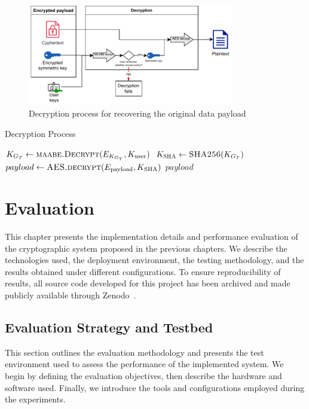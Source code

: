 \documentclass[cic,tc,english]{iiufrgs}
\begin{document}
        \begin{figure}
            \centering
            \includegraphics[width=0.8\textwidth]{images/diagrams/decryption_diagram}
            \caption{Decryption process for recovering the original data payload}
            \label{fig:decryption_diagram}
        \end{figure}

        \begin{algorithm}
            \caption{Decryption Process}
            \label{alg:decryption_process}
            \scriptsize
            \begin{algorithmic}[1]
                \State $K_{G_T} \gets \textsc{maabe.Decrypt}(E_{K_{G_T}}, K_{\text{user}})$
                \State $K_{\textsc{SHA}} \gets \textsc{SHA256}(K_{G_T})$
                \State $payload \gets \textsc{AES.decrypt}(E_{\text{payload}}, K_{\text{SHA}})$
                \State \Return $payload$
            \EndProcedure
            \end{algorithmic}
        \end{algorithm}





\chapter{Evaluation}
    \label{chap:evaluation}
    This chapter presents the implementation details and performance evaluation of the cryptographic system proposed in the previous chapters. We describe the technologies used, the deployment environment, the testing methodology, and the results obtained under different configurations. To ensure reproducibility of results, all source code developed for this project has been archived and made publicly available through Zenodo~\citep{maabeflask}.

    

    \section{Evaluation Strategy and Testbed}
        \label{sec:evaluation-setup}
        This section outlines the evaluation methodology and presents the test environment used to assess the performance of the implemented system. We begin by defining the evaluation objectives, then describe the hardware and software used. Finally, we introduce the tools and configurations employed during the experiments.
\end{document}
